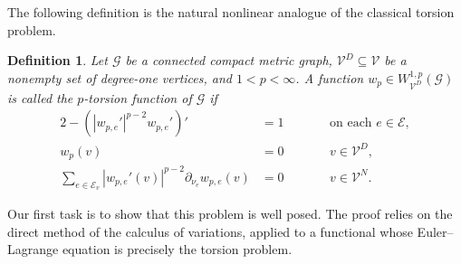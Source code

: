 \documentclass[12pt,a4paper]{article}
\numberwithin{equation}{section}
\newtheorem{definition}[theorem]{Definition}
\newcommand{\WpD}{W^{1,p}_{\mathcal{V}^D}(\mathcal G)}
\begin{document}
The following definition is the natural nonlinear analogue of the
classical torsion problem.

\begin{definition}\label{def:torsionfunction}
	Let $\mathcal G$ be a connected compact metric graph, 
	$\mathcal{V}^D\subseteq \mathcal{V}$ be a nonempty set of degree-one vertices, and 
	$1<p<\infty$.	A function $w_p\in\WpD$ is called the \emph{$p$-torsion function} of
	$\mathcal G$ if
	\begin{alignat}{2}
		-(|w_{p,e}'|^{p-2}w_{p,e}')' &= 1
		&&\qquad \text{on each } e\in \mathcal{E}, \label{eq:pLap}\\
		w_p(v) &=0
		&&\qquad v\in \mathcal{V}^D, \label{eq:Dir}\\
		\sum_{e\in \mathcal{E}_v}|w_{p,e}'(v)|^{p-2}\partial_{\nu_e}w_{p,e}(v) &=0
		&&\qquad v\in\mathcal{V}^N. \label{eq:Kirch}
	\end{alignat}
\end{definition}

Our first task is to show that this problem is well posed. The proof
relies on the direct method of the calculus of variations, applied to a
functional whose Euler--Lagrange equation is precisely the torsion
problem.
\end{document}
